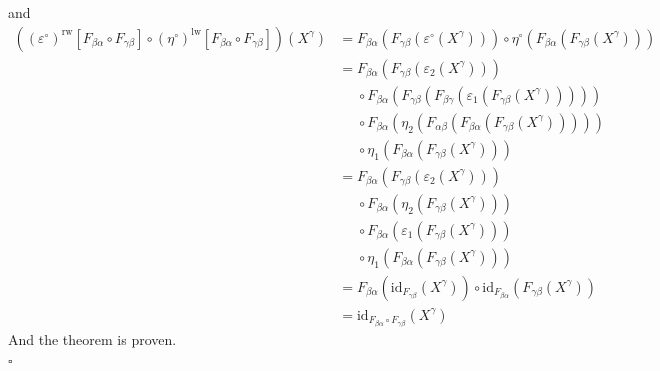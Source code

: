 \begin{prf}
and
\begin{align*}
  \left(
    (\varepsilon^{\circ})^{\textrm{rw}}[F_{\beta\alpha} \circ F_{\gamma\beta}]
    \circ
    (\eta^{\circ})^{\textrm{lw}}[F_{\beta\alpha} \circ F_{\gamma\beta}]
  \right)
  (X^{\gamma})
  &=
  F_{\beta\alpha}
  \left(
    F_{\gamma\beta}
    \left(
      \varepsilon^{\circ}(X^{\gamma})
    \right)
  \right)
  \circ
  \eta^{\circ}
  \left(
    F_{\beta\alpha}
    \left(
      F_{\gamma\beta}(X^{\gamma})
    \right)
  \right)
  \\
  &=
  F_{\beta\alpha}
  \left(
    F_{\gamma\beta}
    \left(
      \varepsilon_{2}(X^{\gamma})
    \right)
  \right)
  \\
  &\phantom{=}
  \circ
  F_{\beta\alpha}
  \left(
    F_{\gamma\beta}
    \left(
      F_{\beta\gamma}
      \left(
        \varepsilon_{1}
        \left(
          F_{\gamma\beta}(X^{\gamma})
        \right)
      \right)
    \right)
  \right)
  \\
  &\phantom{=}
  \circ
  F_{\beta\alpha}
  \left(
    \eta_{2}
    \left(
      F_{\alpha\beta}
      \left(
        F_{\beta\alpha}
        \left(
          F_{\gamma\beta}(X^{\gamma})
        \right)
      \right)
    \right)
  \right)
  \\
  &\phantom{=}
  \circ
  \eta_{1}
  \left(
    F_{\beta\alpha}
    \left(
      F_{\gamma\beta}(X^{\gamma})
    \right)
  \right)
  \\
  &=
  F_{\beta\alpha}
  \left(
    F_{\gamma\beta}
    \left(
      \varepsilon_{2}(X^{\gamma})
    \right)
  \right)
  \\
  &\phantom{=}
  \circ
  F_{\beta\alpha}
  \left(
    \eta_{2}
    \left(
      F_{\gamma\beta}(X^{\gamma})
    \right)
  \right)
  \\
  &\phantom{=}
  \circ
  F_{\beta\alpha}
  \left(
    \varepsilon_{1}
    \left(
      F_{\gamma\beta}(X^{\gamma})
    \right)
  \right)
  \tag{NT}
  \\
  &\phantom{=}
  \circ
  \eta_{1}
  \left(
    F_{\beta\alpha}
    \left(
      F_{\gamma\beta}(X^{\gamma})
    \right)
  \right)
  \\
  &=
  F_{\beta\alpha}
  \left(
    \mathrm{id}_{F_{\gamma\beta}}(X^{\gamma})
  \right)
  \circ
  \mathrm{id}_{F_{\beta\alpha}}
  \left(
      F_{\gamma\beta}(X^{\gamma})
  \right)
  \\
  &=
  \mathrm{id}_{F_{\beta\alpha} \circ F_{\gamma\beta}}(X^{\gamma})
\end{align*}
And the theorem is proven.
\\
\phantom{proven}
\hfill
$\square$
\end{prf}
